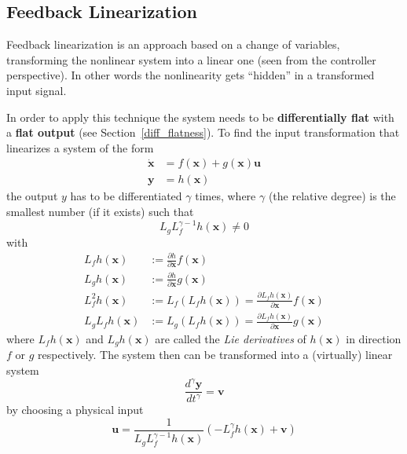 \subsection{Feedback Linearization}
Feedback linearization is an approach based on a change of variables, transforming the nonlinear system into a linear one (seen from the controller perspective). In other words the nonlinearity gets ``hidden'' in a transformed input signal.

In order to apply this technique the system needs to be \textbf{differentially flat} with a \textbf{flat output} (see Section~\ref{diff_flatness}).
\newpar{}
To find the input transformation that linearizes a system of the form
\begin{align*}
    \dot{\mathbf{x}} & = f(\mathbf{x}) + g(\mathbf{x}) \mathbf{u} \\
    \mathbf{y}       & = h(\mathbf{x})
\end{align*}
the output $y$ has to be differentiated $\gamma$ times, where $\gamma$ (the relative degree) is the smallest number (if it exists) such that
\begin{equation*}
    L_g L_f^{\gamma-1} h(\mathbf{x}) \ne 0
\end{equation*}
with
\begin{align*}
    L_f h(\mathbf{x})     & := \frac{\partial h}{\partial \mathbf{x}}f(\mathbf{x})                                           \\
    L_g h(\mathbf{x})     & := \frac{\partial h}{\partial \mathbf{x}}g(\mathbf{x})                                           \\
    L_f^2 h(\mathbf{x})   & := L_f(L_f h(\mathbf{x})) = \frac{\partial L_f h(\mathbf{x})}{\partial \mathbf{x}}f(\mathbf{x})  \\
    L_g L_f h(\mathbf{x}) & := L_g (L_f h(\mathbf{x})) = \frac{\partial L_f h(\mathbf{x})}{\partial \mathbf{x}}g(\mathbf{x})
\end{align*}
where $L_f h(\mathbf{x})$ and $L_g h(\mathbf{x})$ are called the \textit{Lie derivatives} of $h(\mathbf{x})$ in direction $f$ or $g$ respectively.
\newpar{}
The system then can be transformed into a (virtually) linear system
\begin{equation*}
    \frac{d^\gamma \mathbf{y}}{dt^\gamma} = \mathbf{v}
\end{equation*}
by choosing a physical input
\begin{equation*}
    \mathbf{u} = \frac{1}{L_g L_f^{\gamma-1} h(\mathbf{x})}(-L_f^\gamma h(\mathbf{x}) + \mathbf{v})
\end{equation*}

